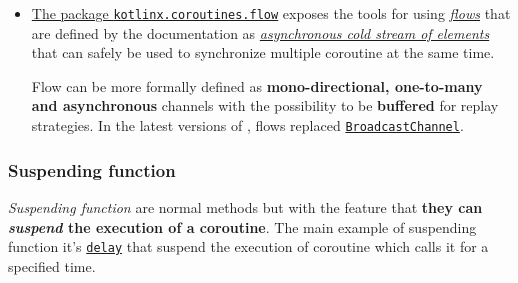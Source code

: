 \begin{itemize}
	Two coroutines can use a channel in order to transfer a single value that came from the \textit{producer} (the coroutine that invoke the \texttt{send} operation) and goes to the \textit{consumer} (the coroutine that invoke the \texttt{receive} operation); in \Kotlin channels are \textbf{bidirectional} and \textbf{symmetric} (one-to-one).
	
	\textbf{The semantic of \textit{send/receive} operations depends on the nature of the channel} that is determinated by its capacity, but the communication can be \textbf{synchronous} or \textbf{asynchronous} with also some little variations of these (for example, \textbf{rendez-vous}).
	Notice that a channel can safely be shared between coroutines, but the developer has to pay attention because the \texttt{receive} operation can easily lead to competition problems if invoked parallel from two or more coroutines.
	
	$\big[$See \href{https://github.com/LM-96/Activity-Project-Operating-Systems-M-/blob/main/code/kotlin/unibo.apos.examples/src/main/kotlin/unibo/apos/examples/ChannelPiCalculation.kt}{\texttt{ChannelPiCalculation.kt}} for a basic example$\big]$
	
	\item \underline{The package \href{https://kotlinlang.org/api/kotlinx.coroutines/kotlinx-coroutines-core/kotlinx.coroutines.flow/}{\texttt{kotlinx.coroutines.flow}}} exposes the tools for using \href{https://kotlinlang.org/docs/flow.html}{\textit{flows}} that are defined by the documentation as \href{https://kotlinlang.org/api/kotlinx.coroutines/kotlinx-coroutines-core/kotlinx.coroutines.flow/L}{\textit{asynchronous cold stream of elements}} that can safely be used to synchronize multiple coroutine at the same time.
	
	Flow can be more formally defined as \textbf{mono-directional, one-to-many and asynchronous} channels with the possibility to be \textbf{buffered} for replay strategies. In the latest versions of \Kotlin, flows replaced \href{https://kotlinlang.org/api/kotlinx.coroutines/kotlinx-coroutines-core/kotlinx.coroutines.channels/-broadcast-channel/}{\texttt{BroadcastChannel}}.
\end{itemize}

\subsubsection{Suspending function}

\textit{Suspending function} are normal \Kotlin methods but with the feature that \textbf{they can \textit{suspend} the execution of a coroutine}. The main example of suspending function it's \href{https://kotlinlang.org/api/kotlinx.coroutines/kotlinx-coroutines-core/kotlinx.coroutines/delay.html}{\texttt{delay}} that suspend the execution of coroutine which calls it for a specified time.


